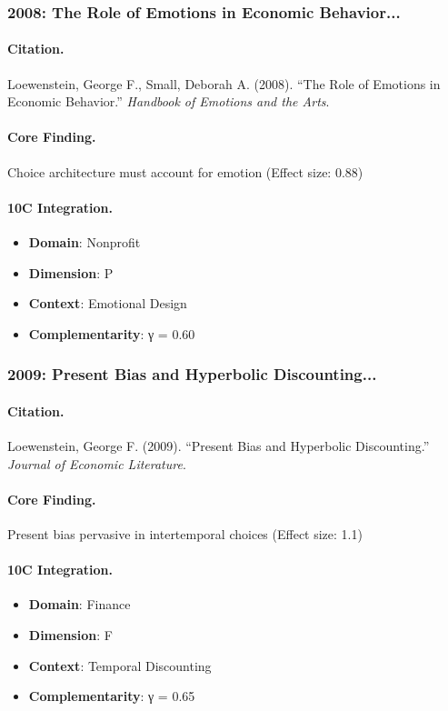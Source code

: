 \subsubsection{2008: The Role of Emotions in Economic Behavior...}

\paragraph{Citation.}
Loewenstein, George F., Small, Deborah A. (2008). ``The Role of Emotions in Economic Behavior.''
\textit{Handbook of Emotions and the Arts}.

\paragraph{Core Finding.}
Choice architecture must account for emotion (Effect size: 0.88)

\paragraph{10C Integration.}
\begin{itemize}[nosep]
  \item \textbf{Domain}: Nonprofit
  \item \textbf{Dimension}: P
  \item \textbf{Context}: Emotional Design
  \item \textbf{Complementarity}: γ = 0.60
\end{itemize}

\subsubsection{2009: Present Bias and Hyperbolic Discounting...}

\paragraph{Citation.}
Loewenstein, George F. (2009). ``Present Bias and Hyperbolic Discounting.''
\textit{Journal of Economic Literature}.

\paragraph{Core Finding.}
Present bias pervasive in intertemporal choices (Effect size: 1.1)

\paragraph{10C Integration.}
\begin{itemize}[nosep]
  \item \textbf{Domain}: Finance
  \item \textbf{Dimension}: F
  \item \textbf{Context}: Temporal Discounting
  \item \textbf{Complementarity}: γ = 0.65
\end{itemize}

